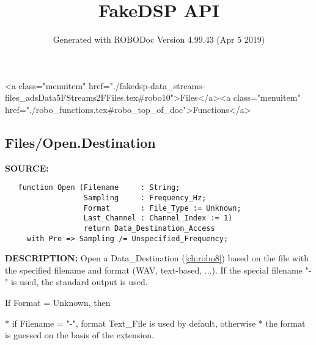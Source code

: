 \documentclass{article}
\title{FakeDSP API}
\author{Generated with ROBODoc Version 4.99.43 (Apr  5 2019)
}
\begin{document}
\maketitle
\printindex
\tableofcontents
\newpage

<a class="menuitem" href="./fakedsp-data_streams-files_adsData5FStreams2FFiles.tex#robo10">Files</a><a class="menuitem" href="./robo_functions.tex#robo_top_of_doc">Functions</a>\subsection{Files/Open.Destination}
\textbf{SOURCE:}\hspace{0.08in}\begin{verbatim}
   function Open (Filename     : String;
                  Sampling     : Frequency_Hz;
                  Format       : File_Type := Unknown;
                  Last_Channel : Channel_Index := 1)
                  return Data_Destination_Access
     with Pre => Sampling /= Unspecified_Frequency;
\end{verbatim}
\textbf{DESCRIPTION:}\hspace{0.08in}
   Open a Data\_Destination (\ref{ch:robo8}) based on the file with the specified filename and
   format (WAV, text-based, ...).   If the special
   filename "-" is used, the standard output is used.



   If Format = Unknown, then



   * if Filename = "-", format Text\_File is used by default, otherwise
   * the format is guessed on the basis of the extension.
\end{document}
